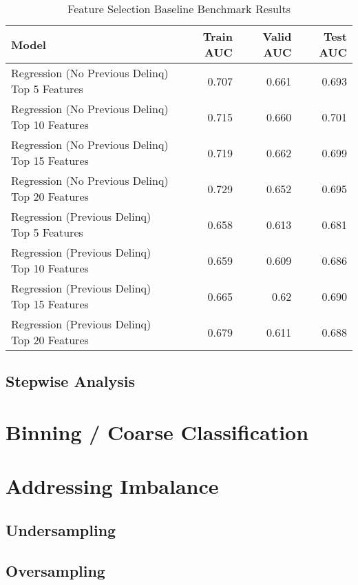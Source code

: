 \begin{table}[H]
	\centering
	\resizebox{\textwidth}{!}
	{
	\begin{tabular}{l | r | r| r}
		\hline
		\textbf{Model} & \textbf{Train AUC} & \textbf{Valid AUC} &  \textbf{Test AUC} \\
		\hline
		Regression (No Previous Delinq) Top 5 Features & 0.707 & 0.661 & 0.693  \\
		Regression (No Previous Delinq) Top 10 Features & 0.715 & 0.660 & 0.701  \\
		 \cellcolor{green!25}Regression (No Previous Delinq) Top 15 Features &  \cellcolor{green!25}0.719 &  \cellcolor{green!25}0.662 &  \cellcolor{green!25}0.699  \\
		Regression (No Previous Delinq) Top 20 Features & 0.729 & 0.652 & 0.695  \\
		\hline
		Regression (Previous Delinq) Top 5 Features & 0.658 & 0.613 & 0.681  \\
		Regression (Previous Delinq) Top 10 Features & 0.659 & 0.609 & 0.686  \\
		 \cellcolor{green!25}Regression (Previous Delinq) Top 15 Features &  \cellcolor{green!25}0.665 &  \cellcolor{green!25}0.62 &  \cellcolor{green!25}0.690  \\
		Regression (Previous Delinq) Top 20 Features & 0.679 & 0.611 & 0.688  \\
		
		\hline
	\end{tabular}
	}
	\caption{Feature Selection Baseline Benchmark Results}
	\label{table:featureselection_base_model}
\end{table}

\subsection{Stepwise Analysis}

\section{Binning / Coarse Classification}

\section{Addressing Imbalance}
\subsection{Undersampling}
\subsection{Oversampling}

